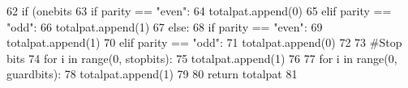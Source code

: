 \begin{DoxyCode}
62             \textcolor{keywordflow}{if} (onebits %
63                 \textcolor{keywordflow}{if} parity == \textcolor{stringliteral}{"even"}:
64                     totalpat.append(0)
65                 \textcolor{keywordflow}{elif} parity == \textcolor{stringliteral}{"odd"}:
66                     totalpat.append(1)
67             \textcolor{keywordflow}{else}:
68                 \textcolor{keywordflow}{if} parity == \textcolor{stringliteral}{"even"}:
69                     totalpat.append(1)
70                 \textcolor{keywordflow}{elif} parity == \textcolor{stringliteral}{"odd"}:
71                     totalpat.append(0)            
72     
73             \textcolor{comment}{#Stop bits}
74             \textcolor{keywordflow}{for} i \textcolor{keywordflow}{in} range(0, stopbits):
75                 totalpat.append(1)
76     
77             \textcolor{keywordflow}{for} i \textcolor{keywordflow}{in} range(0, guardbits):
78                 totalpat.append(1)       
79                 
80     \textcolor{keywordflow}{return} totalpat
81 \end{DoxyCode}
